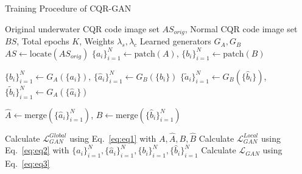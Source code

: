 \documentclass[preprint,12pt]{elsarticle}
\begin{document}
\begin{algorithm}[H]
\caption{Training Procedure of CQR-GAN}
\label{alg:CQR-GAN}
\renewcommand{\algorithmicrequire}{\textbf{Input:}}
\renewcommand{\algorithmicensure}{\textbf{Output:}}
\begin{algorithmic}[1] %
\Require Original underwater CQR code image set $AS_{orig}$, Normal CQR code image set $BS$, Total epochs $K$, Weights $\lambda_s, \lambda_c$ 
\Ensure Learned generators $G_A, G_B$
\State \(AS \leftarrow \text{locate}(AS_{orig})\)   
 
  \State $\{a_i\}_{i=1}^N \leftarrow \text{patch}(A)$, \quad $\{b_i\}_{i=1}^N \leftarrow \text{patch}(B)$ 

  \State $\{\hat b_i\}_{i=1}^N \leftarrow G_A(\{a_i\})$, \quad 
  $\{\hat a_i\}_{i=1}^N \leftarrow G_B(\{b_i\})$
  \State   $\{\tilde a_i\}_{i=1}^N \leftarrow G_B(\{\hat b_i\})$, \quad $\{\tilde b_i\}_{i=1}^N \leftarrow G_A(\{\hat a_i\})$

\State $\hat A \leftarrow \mathrm{merge}(\{\hat a_i\}_{i=1}^N)$, \quad $\hat B \leftarrow \mathrm{merge}(\{\hat b_i\}_{i=1}^N)$  


  \State Calculate $\mathcal{L}_{GAN}^{Global}$ using Eq.~\ref{eq:eq1} with $A, \hat A, B, \hat B$   %
  \State Calculate $\mathcal{L}_{GAN}^{Local}$ using Eq.~\ref{eq:eq2} with $\{a_i\}_{i=1}^N, \{\hat a_i\}_{i=1}^N, \{b_i\}_{i=1}^N, \{\hat b_i\}_{i=1}^N$   %
 \State Calculate $\mathcal{L}_{GAN}$ using Eq.~\ref{eq:eq3} %


\end{algorithmic}
\end{algorithm}
\end{document}
